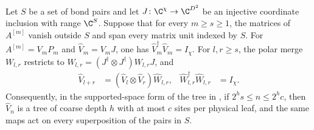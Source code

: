 \begin{lemma}
    \label{thm:ldp_supported_polar_tree}
    \leanok
    Let $S$ be a set of bond pairs and let $J\colon\C^\chi\to\C^{D^2}$
    be an injective coordinate inclusion with range $\C^S$.
    Suppose that for every $m\ge s\ge1$, the matrices of $A^{[m]}$
    vanish outside $S$ and span every matrix unit indexed by $S$.
    For $A^{[m]}=V_mP_m$ and $\widehat V_m=V_mJ$, one has
    $\widehat V_m^\dagger\widehat V_m=I_\chi$.
    For $l,r\ge s$, the polar merge $W_{l,r}$ restricts to
    $\widehat W_{l,r}=(J^\dagger\otimes J^\dagger)W_{l,r}J$, and
    \begin{align}
        \widehat V_{l+r}
         & =(\widehat V_l\otimes\widehat V_r)\widehat W_{l,r},
         & \widehat W_{l,r}^\dagger\widehat W_{l,r}            & =I_\chi.
        \label{eq:ldp_supported_polar_merge}
    \end{align}
    Consequently, in the supported-space form of the tree in
    \cite[eq.~(16), Long-range MPS using measurements]{Malz2024Preparation},
    if $2^h s\le n\le2^h c$, then $\widehat V_n$ is a tree of coarse depth $h$
    with at most $c$ sites per physical leaf, and the same maps act on every
    superposition of the pairs in $S$.


\end{lemma}
